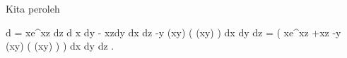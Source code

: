 Kita peroleh

\mavergleichskettealign
{\vergleichskettealign
{ d \omega
}
{ =} { xe^{xz} dz \wedge d x \wedge dy - xzdy \wedge dx \wedge dz  -y \sin (xy)  \cos ( \cos (xy) )  dx \wedge dy \wedge dz
}
{ =} {  \left(  xe^{xz} +xz  -y \sin (xy)  \cos ( \cos (xy) )  \right) dx \wedge dy \wedge dz
}
{ } {
}
{ } {}
}
{}
{}{.}
